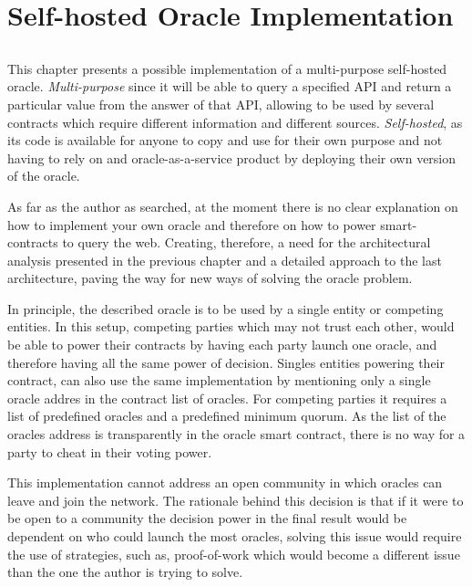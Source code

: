 \chapter{Self-hosted Oracle Implementation} \label{chap:chap6}

\section*{}

This chapter presents a possible implementation of a multi-purpose self-hosted oracle. \textit{Multi-purpose} since it will be able to query a specified API and return a particular value from the answer of that API, allowing to be used by several contracts which require different information and different sources. \textit{Self-hosted}, as its code is available for anyone to copy and use for their own purpose and not having to rely on and oracle-as-a-service product by deploying their own version of the oracle.

As far as the author as searched, at the moment there is no clear explanation on how to implement your own oracle and therefore on how to power smart-contracts to query the web.
Creating, therefore, a need for the architectural analysis presented in the previous chapter and a detailed approach to the last architecture, paving the way for new ways of solving the oracle problem.

In principle, the described oracle is to be used by a single entity or competing entities. In this setup, competing parties which may not trust each other, would be able to power their contracts by having each party launch one oracle, and therefore having all the same power of decision. Singles entities powering their contract, can also use the same implementation by mentioning only a single oracle addres in the contract list of oracles. For competing parties it requires a list of predefined oracles and a predefined minimum quorum. As the list of the oracles address is transparently in the oracle smart contract, there is no way for a party to cheat in their voting power.

This implementation cannot address an open community in which oracles can leave and join the network. The rationale behind this decision is that if it were to be open to a community the decision power in the final result would be dependent on who could launch the most oracles, solving this issue would require  the use of strategies, such as, proof-of-work which would become a different issue than the one the author is trying to solve.

